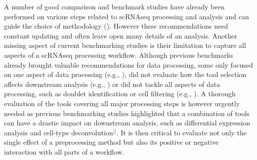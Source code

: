 \documentclass[11pt]{article}
\renewcommand{\cite}[1]{\textcolor{Blue}{$^[$\supercite{#1}$^]$}}
\begin{document}
A number of good comparison and benchmark studies have already been performed on various steps related to scRNAseq processing and analysis and can guide the choice of methodology (\citealp{CobosDeconvolution2020, colePerformance2018, DalMolinDE2017, duoClustering2018, freytagComparison2018, GaoProcessing2020, HeiserDimred2019, HouImput2020, JaakkolaDE2017, KrzakClust2019, SonesonDE2018, SunDimRed2019, tianMixology2018, TranBatch2020, TsuyuzakiPCA2020, viethSystematic2019, WangDE2019, YipHVGs2018, ZhangImput2018}). However these recommendations need constant updating and often leave open many details of an analysis. Another missing aspect of current benchmarking studies is their limitation to capture all aspects of a scRNAseq processing workflow. Although previous benchmarks already brought valuable recommendations for data processing, some only focused on one aspect of data processing (e.g., \citealp{SunDimRed2019}), did not evaluate how the tool selection affects downstream analysis (e.g., \citealp{TsuyuzakiPCA2020}) or did not tackle all aspects of data processing, such as doublet identification or cell filtering (e.g., \citealp{viethSystematic2019}). A thorough evaluation of the tools covering all major processing steps is however urgently needed as previous benchmarking studies highlighted that a combination of tools can have a drastic impact on downstream analysis, such as differential expression analysis and cell-type deconvolution\cite{viethSystematic2019,CobosDeconvolution2020}. It is then critical to evaluate not only the single effect of a preprocessing method but also its positive or negative interaction with all parts of a workflow.
\end{document}
